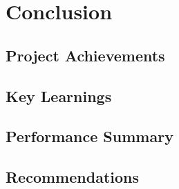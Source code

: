 \chapter{Conclusion}

\section{Project Achievements}

\section{Key Learnings}

\section{Performance Summary}

\section{Recommendations}
